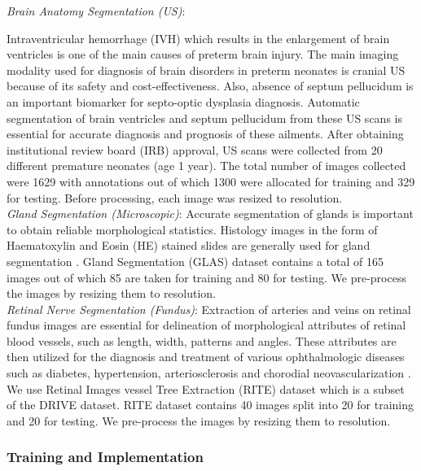 \documentclass[journal,twoside,web]{ieeecolor}
\begin{document}
\noindent\textit{Brain Anatomy Segmentation (US)}:

 Intraventricular hemorrhage (IVH) which results in the enlargement of brain ventricles is one of the main causes of preterm brain injury. The main imaging modality used for diagnosis of brain disorders in preterm neonates is cranial US because of its safety and cost-effectiveness. Also, absence of septum pellucidum is an important biomarker for septo-optic dysplasia diagnosis. Automatic segmentation of brain ventricles and septum pellucidum from these US scans is essential for accurate diagnosis and prognosis of these ailments. After obtaining institutional review board (IRB) approval, US scans were collected from 20 different premature neonates (age  1 year). The total number of images collected were 1629 with annotations out of which 1300 were allocated for training and 329 for testing. Before processing, each image was resized to   resolution.\\


\noindent\textit{Gland Segmentation (Microscopic)}:
 Accurate segmentation of glands is important to obtain reliable morphological statistics. Histology images in the form of Haematoxylin and Eosin (HE) stained slides are generally used for gland segmentation \cite{sirinukunwattana2017gland}. Gland Segmentation (GLAS) dataset contains a total of 165 images out of which 85 are taken for training and 80 for testing. We pre-process the images by resizing them to  resolution. \\


\noindent\textit{Retinal Nerve Segmentation (Fundus)}: 
Extraction of arteries and veins on retinal fundus images are essential for delineation of morphological attributes of retinal blood vessels, such as length, width, patterns and angles. These attributes are then utilized for the diagnosis and treatment of various ophthalmologic diseases such as diabetes, hypertension, arteriosclerosis and chorodial neovascularization \cite{staal2004ridge}. We use Retinal Images vessel Tree Extraction (RITE) dataset \cite{hu2013automated} which is  a subset of the DRIVE dataset.  RITE dataset contains 40 images split into 20 for training and 20 for testing. We pre-process the images by resizing them to  resolution.



\subsubsection{Training and Implementation}
\end{document}
